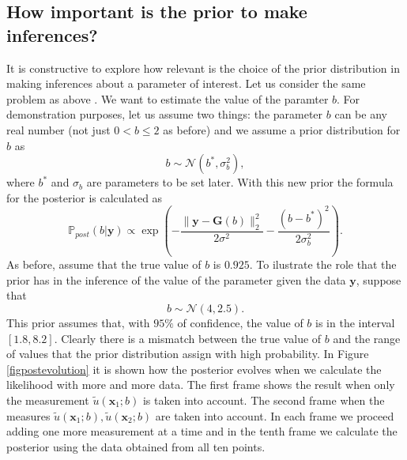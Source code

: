 \documentclass[12pt]{book}
\newcommand{\post}{\mathbb{P}_{post}}
\newcommand{\x}{\textbf{x}}
\begin{document}
\subsection*{How important is the prior to make inferences?}
It is constructive to  explore how relevant is the choice  of the prior distribution
in making inferences about a parameter of interest. Let us consider the same problem as above
. We want to estimate
the value of the paramter $b$. For demonstration purposes, let us assume two things: the parameter
$b$ can be any real number (not just $0<b\leq 2$ as before) and we assume a prior distribution for $b$ as
\begin{equation*}
b\sim\mathscr{N}(b^{*},\sigma_{b}^{2}),
\end{equation*}
where $b^{*}$ and $\sigma_{b}$ are parameters to be set later.  With this new prior the formula
for the posterior is calculated as 
\begin{equation*}
\post(b|\textbf{y})\propto \exp\left(-\frac{\|\textbf{y}-\textbf{G}(b)\|_{2}^{2}}{2\sigma^{2}}-\frac{(b-b^{*})^{2}}{2\sigma_{b}^{2}}\right).
\end{equation*}
As before, assume that the true
value of $b$ is $0.925$. To ilustrate the role that the prior has in the inference of the value
of the parameter given the data $\textbf{y}$, suppose that 
\begin{equation*}
b\sim\mathscr{N}(4,2.5).
\end{equation*}
This prior assumes that, with $95\%$ of confidence, the value of
$b$ is in the interval $[1.8,8.2]$. Clearly there is a mismatch between
the true value of $b$ and the range of values that the prior distribution
assign with high probability. In Figure \ref{figpostevolution} it is shown
how the posterior evolves when we calculate the likelihood with more 
and more data. The first frame shows the result when only the measurement
$\tilde{u}(\x_{1};b)$ is taken into account. The second frame
when the measures $\tilde{u}(\x_{1};b),\tilde{u}(\x_{2};b)$ are taken
into account. In each frame we proceed adding one more measurement 
at a time and in the tenth frame we calculate the posterior
using the data obtained from all ten points.
\end{document}
